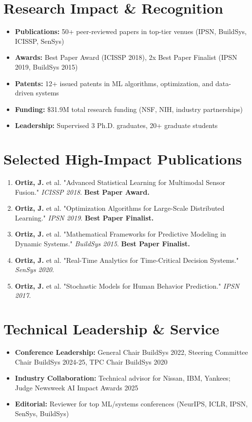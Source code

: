 \documentclass[11pt]{article}
\begin{document}
\section{Research Impact \& Recognition}
\begin{itemize}
    \item \textbf{Publications:} 50+ peer-reviewed papers in top-tier venues (IPSN, BuildSys, ICISSP, SenSys)
    \item \textbf{Awards:} Best Paper Award (ICISSP 2018), 2x Best Paper Finalist (IPSN 2019, BuildSys 2015)
    \item \textbf{Patents:} 12+ issued patents in ML algorithms, optimization, and data-driven systems
    \item \textbf{Funding:} \$31.9M total research funding (NSF, NIH, industry partnerships)
    \item \textbf{Leadership:} Supervised 3 Ph.D. graduates, 20+ graduate students
\end{itemize}

\section{Selected High-Impact Publications}
\begin{enumerate}[topsep=1pt,itemsep=0pt]
    \item \textbf{Ortiz, J.} et al. "Advanced Statistical Learning for Multimodal Sensor Fusion." \textit{ICISSP 2018}. \textbf{Best Paper Award.}
    \item \textbf{Ortiz, J.} et al. "Optimization Algorithms for Large-Scale Distributed Learning." \textit{IPSN 2019}. \textbf{Best Paper Finalist.}
    \item \textbf{Ortiz, J.} et al. "Mathematical Frameworks for Predictive Modeling in Dynamic Systems." \textit{BuildSys 2015}. \textbf{Best Paper Finalist.}
    \item \textbf{Ortiz, J.} et al. "Real-Time Analytics for Time-Critical Decision Systems." \textit{SenSys 2020}.
    \item \textbf{Ortiz, J.} et al. "Stochastic Models for Human Behavior Prediction." \textit{IPSN 2017}.
\end{enumerate}

\section{Technical Leadership \& Service}
\begin{itemize}
    \item \textbf{Conference Leadership:} General Chair BuildSys 2022, Steering Committee Chair BuildSys 2024-25, TPC Chair BuildSys 2020
    \item \textbf{Industry Collaboration:} Technical advisor for Nissan, IBM, Yankees; Judge Newsweek AI Impact Awards 2025
    \item \textbf{Editorial:} Reviewer for top ML/systems conferences (NeurIPS, ICLR, IPSN, SenSys, BuildSys)
\end{itemize}
\end{document}

